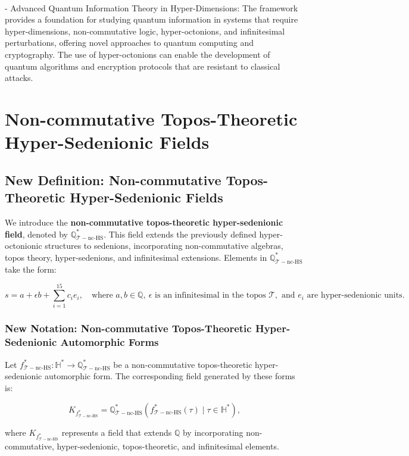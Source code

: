 \documentclass{article}
\begin{document}
{\ }\\
- Advanced Quantum Information Theory in Hyper-Dimensions: The framework provides a foundation for studying quantum information in systems that require hyper-dimensions, non-commutative logic, hyper-octonions, and infinitesimal perturbations, offering novel approaches to quantum computing and cryptography. The use of hyper-octonions can enable the development of quantum algorithms and encryption protocols that are resistant to classical attacks.


\section{Non-commutative Topos-Theoretic Hyper-Sedenionic Fields}
\subsection{New Definition: Non-commutative Topos-Theoretic Hyper-Sedenionic Fields}
We introduce the \textbf{non-commutative topos-theoretic hyper-sedenionic field}, denoted by \(\mathbb{Q}_{\mathcal{T}-\text{nc-HS}}^*\). This field extends the previously defined hyper-octonionic structures to sedenions, incorporating non-commutative algebras, topos theory, hyper-sedenions, and infinitesimal extensions. Elements in \(\mathbb{Q}_{\mathcal{T}-\text{nc-HS}}^*\) take the form:

\[
s = a + \epsilon b + \sum_{i=1}^{15} c_i e_i, \quad \text{where } a, b \in \mathbb{Q}, \ \epsilon \text{ is an infinitesimal in the topos } \mathcal{T}, \text{ and } e_i \text{ are hyper-sedenionic units}.
\]

\subsubsection{New Notation: Non-commutative Topos-Theoretic Hyper-Sedenionic Automorphic Forms}
Let \(f_{\mathcal{T}-\text{nc-HS}}^*: \mathbb{H}^* \to \mathbb{Q}_{\mathcal{T}-\text{nc-HS}}^*\) be a non-commutative topos-theoretic hyper-sedenionic automorphic form. The corresponding field generated by these forms is:

\[
K_{f_{\mathcal{T}-\text{nc-HS}}^*} = \mathbb{Q}_{\mathcal{T}-\text{nc-HS}}^*(f_{\mathcal{T}-\text{nc-HS}}^*(\tau) \mid \tau \in \mathbb{H}^*),
\]

where \(K_{f_{\mathcal{T}-\text{nc-HS}}^*}\) represents a field that extends \(\mathbb{Q}\) by incorporating non-commutative, hyper-sedenionic, topos-theoretic, and infinitesimal elements.
\end{document}
